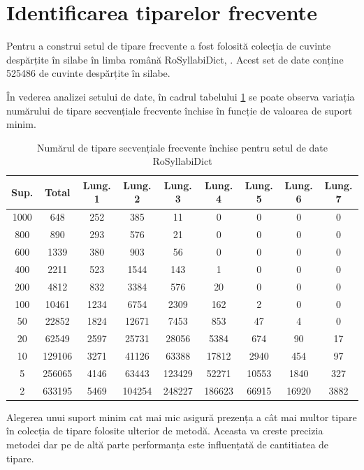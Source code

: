 \section{Identificarea tiparelor frecvente}

Pentru a construi setul de tipare frecvente a fost folosită colecția de cuvinte despărțite în silabe în limba română RoSyllabiDict, \cite{bib:BARBU08.495}. Acest set de date conține 525486 de cuvinte despărțite în silabe. 

În vederea analizei setului de date, în cadrul tabelului \ref{table:sdb_counts} se poate observa variația numărului de tipare secvențiale frecvente închise în funcție de valoarea de suport minim.   

\begin{table}[h!]
\centering
\begin{tabular}{|c|c|c|c|c|c|c|c|c|}
\hline
Sup.& Total & Lung. 1 & Lung. 2 & Lung. 3 & Lung. 4 & Lung. 5 & Lung. 6 & Lung. 7\\ 
\hline
\hline
1000 & 648 & 252 & 385 & 11 & 0 & 0 & 0 & 0\\ 
\hline
800 & 890 & 293 & 576 & 21 & 0 & 0 & 0 & 0\\ 
\hline
600 & 1339 & 380 & 903 & 56 & 0 & 0 & 0 & 0\\ 
\hline
400 & 2211 & 523 & 1544 & 143 & 1 & 0 & 0 & 0\\ 
\hline
200 & 4812 & 832 & 3384 & 576 & 20 & 0 & 0 & 0\\ 
\hline
100 & 10461 & 1234 & 6754 & 2309 & 162 & 2 & 0 & 0\\ 
\hline
50 & 22852 & 1824 & 12671 & 7453 & 853 & 47 & 4 & 0\\ 
\hline
20 & 62549 & 2597 & 25731 & 28056 & 5384 & 674 & 90 & 17\\ 
\hline
10 & 129106 & 3271 & 41126 & 63388 & 17812 & 2940 & 454 & 97\\ 
\hline
5 & 256065 & 4146 & 63443 & 123429 & 52271 & 10553 & 1840 & 327\\ 
\hline
2 & 633195 & 5469 & 104254 & 248227 & 186623 & 66915 & 16920 & 3882\\ 
\hline\end{tabular}
\label{table:sdb_counts}
\caption{Numărul de tipare secvențiale frecvente închise pentru setul de date RoSyllabiDict} 
\end{table}

Alegerea unui suport minim cat mai mic asigură prezența a cât mai multor tipare în colecția de tipare folosite ulterior de metodă. Aceasta va creste precizia metodei dar pe de altă parte performanța este influențată de cantitiatea de tipare. 

